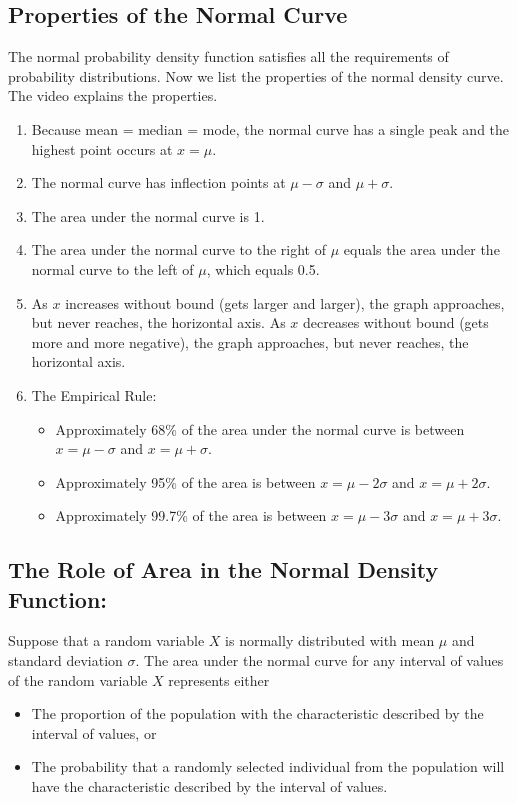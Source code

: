 \documentclass{report}
\begin{document}
      \subsection*{Properties of the Normal Curve}
      \bigbreak \noindent 
          The normal probability density function satisfies all the requirements of probability distributions. Now we list the properties of the normal density curve. The video explains the properties.
    \begin{enumerate}
    \item Because mean = median = mode, the normal curve has a single peak and the highest point occurs at $x=\mu$.
    \item The normal curve has inflection points at $\mu-\sigma$ and $\mu+\sigma$.
    \item The area under the normal curve is 1.
    \item The area under the normal curve to the right of $\mu$ equals the area under the normal curve to the left of $\mu$, which equals 0.5.
    \item As $x$ increases without bound (gets larger and larger), the graph approaches, but never reaches, the horizontal axis. As $x$ decreases without bound (gets more and more negative), the graph approaches, but never reaches, the horizontal axis.
    \item The Empirical Rule:
    \begin{itemize}
        \item Approximately 68\% of the area under the normal curve is between $x=\mu-\sigma$ and $x=\mu+\sigma$.
        \item Approximately 95\% of the area is between $x=\mu-2\sigma$ and $x=\mu+2\sigma$.
        \item Approximately 99.7\% of the area is between $x=\mu-3\sigma$ and $x=\mu+3\sigma$.
    \end{itemize}
    \end{enumerate}

    \pagebreak 
    \subsection*{The Role of Area in the Normal Density Function:}
    \bigbreak \noindent 
        \bigbreak \noindent 
    Suppose that a random variable $X$ is normally distributed with mean $\mu$ and standard deviation $\sigma$. The area under the normal curve for any interval of values of the random variable $X$ represents either
    \bigbreak \noindent 
    \begin{itemize}
        \item The proportion of the population with the characteristic described by the interval of values,
        \smallbreak
        or
        \item The probability that a randomly selected individual from the population will have the characteristic described by the interval of values.
    \end{itemize}
\end{document}
